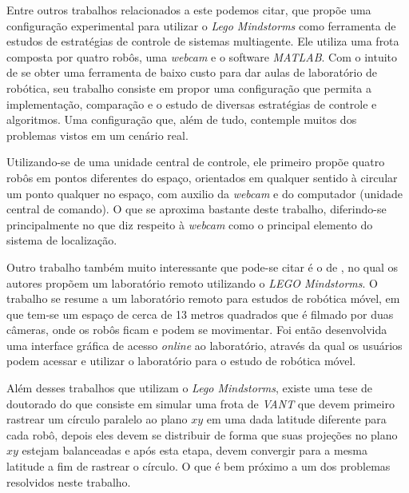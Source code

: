 Entre outros trabalhos relacionados a este podemos citar,  que propõe uma configuração experimental para utilizar o \emph{Lego  Mindstorms\textregistered} como ferramenta de estudos de estratégias de controle de sistemas multiagente. Ele utiliza uma frota composta por quatro robôs, uma \emph{webcam} e o software \emph{MATLAB{\textregistered}}. Com o intuito de se obter uma ferramenta de baixo custo para dar aulas de laboratório de robótica, seu trabalho consiste em propor uma configuração que permita a implementação, comparação e o estudo de diversas estratégias de controle e algoritmos. Uma configuração que, além de tudo, contemple muitos dos problemas vistos em um cenário real. 

Utilizando-se de uma unidade central de controle, ele primeiro propõe quatro robôs em pontos diferentes do espaço, orientados em qualquer sentido à circular um ponto qualquer no espaço, com auxilio da \emph{webcam} e do computador (unidade central de comando). O que se aproxima bastante deste trabalho, diferindo-se principalmente no que diz respeito à \emph{webcam} como o principal elemento do sistema de localização. %

Outro trabalho também muito interessante que pode-se citar é o de , no qual os autores propõem um laboratório remoto utilizando o \emph{LEGO  Mindstorms\textregistered}. O trabalho se resume  a um laboratório remoto para estudos de robótica móvel, em que tem-se um espaço de cerca de 13 metros quadrados que é filmado por duas câmeras, onde os robôs ficam e podem se movimentar. Foi então desenvolvida uma interface gráfica de acesso \emph{online} ao laboratório, através da qual os usuários podem acessar e utilizar o laboratório para o estudo de robótica móvel. 

Além desses trabalhos que utilizam o \emph{Lego Mindstorms\textregistered}, existe uma tese de doutorado do  que consiste em simular uma frota de \emph{VANT} que devem primeiro rastrear um círculo paralelo ao plano $xy$ em uma dada latitude diferente para cada robô, depois eles devem se distribuir de forma que suas projeções no plano $xy$ estejam balanceadas e após esta etapa, devem convergir para a mesma latitude a fim de rastrear o círculo. O que é bem próximo a um dos problemas resolvidos neste trabalho. 

